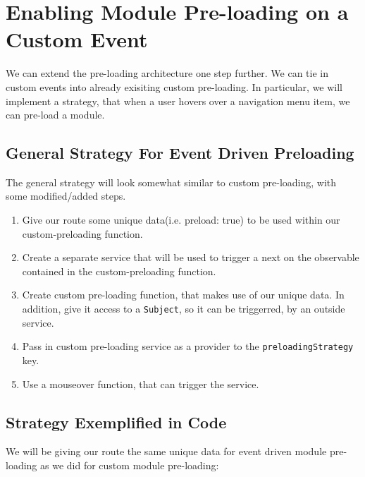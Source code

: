 \section{ Enabling Module Pre-loading on a Custom Event }
We can extend the pre-loading architecture one step further. We can
tie in custom events into already exisiting custom pre-loading. In particular, we 
will implement a strategy, that when a user hovers over a navigation menu item, 
we can pre-load a module. 

\subsection{ General Strategy For Event Driven Preloading}
The general strategy will look somewhat similar to custom pre-loading, with
some modified/added steps.

\begin{enumerate}
  \item Give our route some unique data(i.e. preload: true)
   to be used within our custom-preloading function.
   \item Create a separate service that will be used to trigger a next on the 
   observable contained in the custom-preloading function. 
   \item Create custom pre-loading function, that makes use of our unique data. In addition, 
   give it access to a \lstinline{Subject}, so it can be triggerred, by an outside service. 
   \item Pass in custom pre-loading service as a provider to the \lstinline{preloadingStrategy} 
   key.
  \item Use a mouseover function, that can trigger the service.
\end{enumerate}

\subsection{ Strategy Exemplified in Code }
We will be giving our route the same unique data for event driven module pre-loading 
as we did for custom module pre-loading: 

